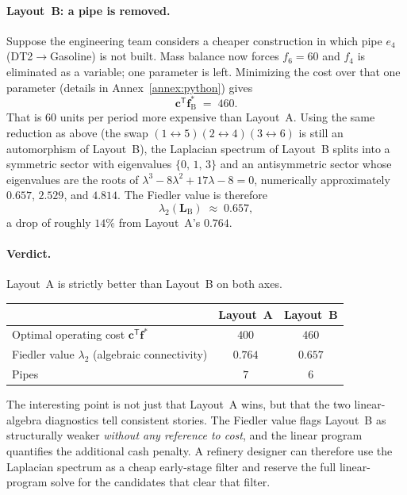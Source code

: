 \documentclass[11pt,a4paper]{article}
\newcommand{\mat}[1]{\mathbf{#1}}
\newcommand{\vect}[1]{\mathbf{#1}}
\newcommand{\transpose}{^{\mathsf{T}}}
\begin{document}
\paragraph{Layout~B: a pipe is removed.}
Suppose the engineering team considers a cheaper construction in which
pipe $e_4$ (DT2$\to$Gasoline) is not built. Mass balance now forces
$f_6 = 60$ and $f_4$ is eliminated as a variable; one parameter is
left. Minimizing the cost over that one parameter (details in
Annex~\ref{annex:python}) gives
\[
  \vect{c}\transpose \vect{f}^{*}_{\mathrm{B}} \;=\; 460.
\]
That is $60$ units per period more expensive than Layout~A. Using the
same reduction as above (the swap $(1 \leftrightarrow 5)(2
\leftrightarrow 4)(3 \leftrightarrow 6)$ is still an automorphism of
Layout~B), the Laplacian spectrum of Layout~B splits into a symmetric
sector with eigenvalues $\{0,\, 1,\, 3\}$ and an antisymmetric sector
whose eigenvalues are the roots of $\lambda^3 - 8\lambda^2 + 17\lambda
- 8 = 0$, numerically approximately $0.657$, $2.529$, and $4.814$. The
Fiedler value is therefore
\[
  \lambda_2(\mat{L}_{\mathrm{B}}) \;\approx\; 0.657,
\]
a drop of roughly $14\%$ from Layout~A's $0.764$.

\paragraph{Verdict.}
Layout~A is strictly better than Layout~B on both axes.
\begin{center}
\begin{tabular}{@{}lcc@{}}
\toprule
           & Layout~A & Layout~B \\
\midrule
Optimal operating cost $\vect{c}\transpose\vect{f}^{*}$ & $400$   & $460$   \\
Fiedler value $\lambda_2$ (algebraic connectivity)      & $0.764$ & $0.657$ \\
Pipes                                                   & $7$     & $6$     \\
\bottomrule
\end{tabular}
\end{center}
The interesting point is not just that Layout~A wins, but that the two
linear-algebra diagnostics tell consistent stories. The Fiedler value
flags Layout~B as structurally weaker \emph{without any reference to
cost}, and the linear program quantifies the additional cash penalty.
A refinery designer can therefore use the Laplacian spectrum as a
cheap early-stage filter and reserve the full linear-program solve for
the candidates that clear that filter.
\end{document}
